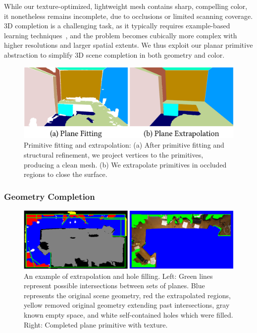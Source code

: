 While our texture-optimized, lightweight mesh contains sharp, compelling color, it nonetheless remains incomplete, due to occlusions or limited scanning coverage.
3D completion is a challenging task, as it typically requires example-based learning techniques~\cite{dai2017complete}, and the problem becomes cubically more complex with higher resolutions and larger spatial extents.
We thus exploit our planar primitive abstraction to simplify 3D scene completion in both geometry and color.%
\begin{figure}
    \centering
    \includegraphics[width=0.8\linewidth]{3dlite/fig7.png}
    \caption{Primitive fitting and extrapolation: (a) After primitive fitting and structural refinement, we project vertices to the primitives, producing a clean mesh. (b) We extrapolate primitives in occluded regions to close the surface.}
    \label{fig:3dlite-plane-fit}
\end{figure}

\subsubsection{Geometry Completion}
\label{subsec:3dlite-extrapolate}
\begin{figure}
    \centering
    \includegraphics[width=0.8\linewidth]{3dlite/fig9.png}
    \caption{An example of extrapolation and hole filling. Left: Green lines represent possible intersections between sets of planes. Blue represents the original scene geometry, red the extrapolated regions, yellow removed original geometry extending past intersections, gray known empty space, and white self-contained holes which were filled. Right: Completed plane primitive with texture.}
    \label{fig:3dlite-plane-fill}
\end{figure}

